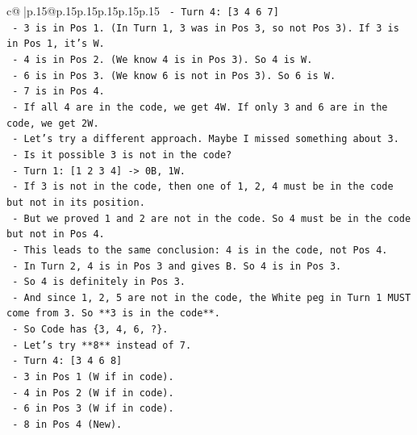 \documentclass{article}
\begin{document}
{\begin{supertabular}{c@{$\;$}|p{.15\linewidth}@{}p{.15\linewidth}p{.15\linewidth}p{.15\linewidth}p{.15\linewidth}p{.15\linewidth}}
{{{\texttt{              {-} Turn 4: {[}3 4 6 7{]}} \\
\texttt{                {-} 3 is in Pos 1. (In Turn 1, 3 was in Pos 3, so not Pos 3). If 3 is in Pos 1, it's W.} \\
\texttt{                {-} 4 is in Pos 2. (We know 4 is in Pos 3). So 4 is W.} \\
\texttt{                {-} 6 is in Pos 3. (We know 6 is not in Pos 3). So 6 is W.} \\
\texttt{                {-} 7 is in Pos 4.} \\
\texttt{                {-} If all 4 are in the code, we get 4W. If only 3 and 6 are in the code, we get 2W.} \\
\texttt{                {-} Let's try a different approach. Maybe I missed something about 3.} \\
\texttt{                {-} Is it possible 3 is not in the code?} \\
\texttt{                  {-} Turn 1: {[}1 2 3 4{]} {-}> 0B, 1W.} \\
\texttt{                  {-} If 3 is not in the code, then one of 1, 2, 4 must be in the code but not in its position.} \\
\texttt{                  {-} But we proved 1 and 2 are not in the code. So 4 must be in the code but not in Pos 4.} \\
\texttt{                  {-} This leads to the same conclusion: 4 is in the code, not Pos 4.} \\
\texttt{                  {-} In Turn 2, 4 is in Pos 3 and gives B. So 4 is in Pos 3.} \\
\texttt{                  {-} So 4 is definitely in Pos 3.} \\
\texttt{                  {-} And since 1, 2, 5 are not in the code, the White peg in Turn 1 MUST come from 3. So **3 is in the code**.} \\
\texttt{                  {-} So Code has \{3, 4, 6, ?\}.} \\
\texttt{                  {-} Let's try **8** instead of 7.} \\
\texttt{                  {-} Turn 4: {[}3 4 6 8{]}} \\
\texttt{                    {-} 3 in Pos 1 (W if in code).} \\
\texttt{                    {-} 4 in Pos 2 (W if in code).} \\
\texttt{                    {-} 6 in Pos 3 (W if in code).} \\
\texttt{                    {-} 8 in Pos 4 (New).} \\
}}}
\end{supertabular}}
\end{document}
